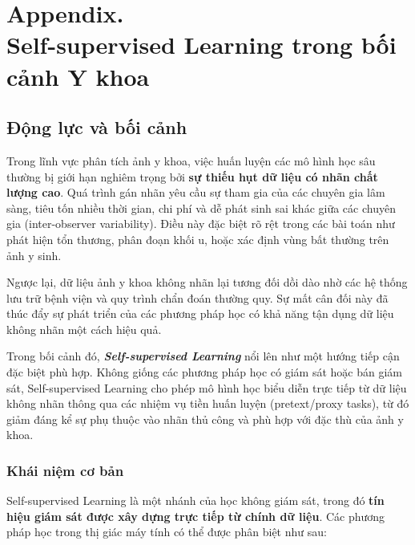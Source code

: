 \chapter*{Appendix. \\ Self-supervised Learning trong bối cảnh Y khoa}


\label{appendix:selfsl_medical}

\section{Động lực và bối cảnh}
\label{appendix:selfsl_motivation}

Trong lĩnh vực phân tích ảnh y khoa, việc huấn luyện các mô hình học sâu thường bị giới hạn nghiêm trọng bởi \textbf{sự thiếu hụt dữ liệu có nhãn chất lượng cao}. Quá trình gán nhãn yêu cầu sự tham gia của các chuyên gia lâm sàng, tiêu tốn nhiều thời gian, chi phí và dễ phát sinh sai khác giữa các chuyên gia (inter-observer variability). Điều này đặc biệt rõ rệt trong các bài toán như phát hiện tổn thương, phân đoạn khối u, hoặc xác định vùng bất thường trên ảnh y sinh.

Ngược lại, dữ liệu ảnh y khoa không nhãn lại tương đối dồi dào nhờ các hệ thống lưu trữ bệnh viện và quy trình chẩn đoán thường quy. Sự mất cân đối này đã thúc đẩy sự phát triển của các phương pháp học có khả năng tận dụng dữ liệu không nhãn một cách hiệu quả.

Trong bối cảnh đó, \textbf{\textit{Self-supervised Learning}} nổi lên như một hướng tiếp cận đặc biệt phù hợp. Không giống các phương pháp học có giám sát hoặc bán giám sát, Self-supervised Learning cho phép mô hình học biểu diễn trực tiếp từ dữ liệu không nhãn thông qua các nhiệm vụ tiền huấn luyện (pretext/proxy tasks), từ đó giảm đáng kể sự phụ thuộc vào nhãn thủ công và phù hợp với đặc thù của ảnh y khoa.

\subsection{Khái niệm cơ bản}
\label{appendix:selfsl_concepts}

Self-supervised Learning là một nhánh của học không giám sát, trong đó \textbf{tín hiệu giám sát được xây dựng trực tiếp từ chính dữ liệu}. Các phương pháp học trong thị giác máy tính có thể được phân biệt như sau:

